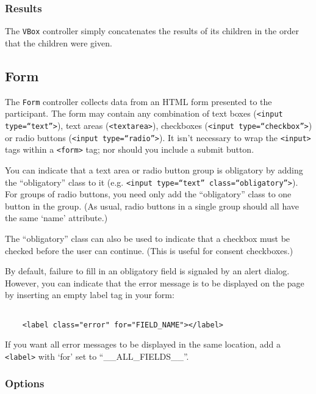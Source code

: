 \documentclass[11pt,letterpaper]{article}
\begin{document}
\normalsize

\subsubsection*{Results}

The \texttt{VBox} controller simply concatenates the results of its children in the order that the children were given.

\subsection{Form}

The \texttt{Form} controller collects data from an HTML form presented to the participant.
The form may contain any combination of text boxes (\texttt{<input type=``text''>}), text areas (\texttt{<textarea>}),
checkboxes (\texttt{<input type=``checkbox''>}) or radio buttons (\texttt{<input type=``radio''>}).
It isn't necessary to wrap the \texttt{<input>} tags within a \texttt{<form>} tag; nor should
you include a submit button.

You can indicate that a text area or radio button group is obligatory by adding
the ``obligatory'' class to it (e.g. \texttt{<input type=``text'' class=``obligatory''>}).
For groups of radio buttons, you need only add the ``obligatory'' class
to one button in the group. (As usual, radio buttons in a single group should
all have the same `name' attribute.)

The ``obligatory'' class can also be used to indicate that a checkbox must be checked
before the user can continue. (This is useful for consent checkboxes.)

By default, failure to fill in an obligatory field is signaled by an alert dialog.
However, you can indicate that the error message is to be displayed on the page
by inserting an empty label tag in your form:
\footnotesize\begin{verbatim}

    <label class="error" for="FIELD_NAME"></label>
\end{verbatim}

\smallskip\noindent\normalsize

If you want all error messages to
be displayed in the same location, add a \texttt{<label>} with `for' set to ``\_\_ALL\_FIELDS\_\_''.

\subsubsection*{Options}
\end{document}
